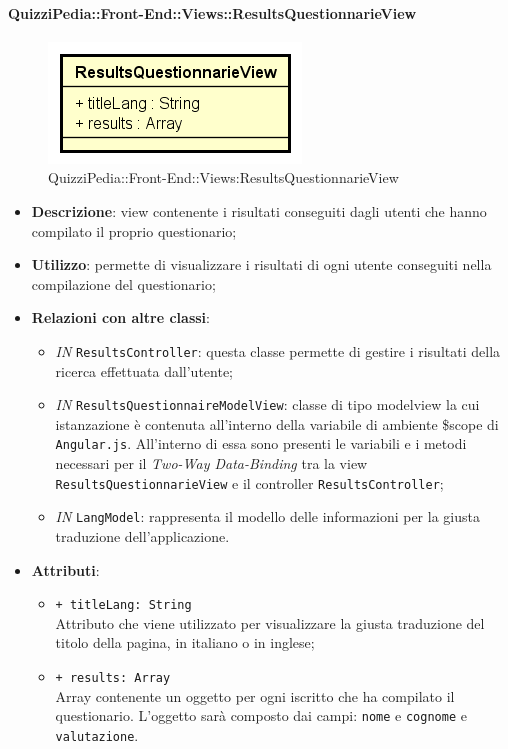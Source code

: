 \paragraph{QuizziPedia::Front-End::Views::ResultsQuestionnarieView}
\begin{figure} [ht]
	\centering
	\includegraphics[scale=0.80]{UML/Classi/Front-End/QuizziPedia_Front-end_ResultsQuestionnarieView.png}
	\caption{QuizziPedia::Front-End::Views:ResultsQuestionnarieView}
\end{figure} \FloatBarrier
\begin{itemize}
	\item \textbf{Descrizione}: view contenente i risultati conseguiti dagli utenti che hanno compilato il proprio questionario;
	\item \textbf{Utilizzo}: permette di visualizzare i risultati di ogni utente conseguiti nella compilazione del questionario;
	\item \textbf{Relazioni con altre classi}:
	\begin{itemize}
		\item \textit{IN} \texttt{ResultsController}: questa classe permette di gestire i risultati della ricerca effettuata dall'utente;
		\item \textit{IN} \texttt{ResultsQuestionnaireModelView}: classe di tipo modelview la cui istanzazione è contenuta all'interno della variabile di ambiente \$scope di \texttt{Angular.js}. All'interno di essa sono presenti le variabili e i metodi necessari per il \textit{Two-Way Data-Binding} tra la view \texttt{ResultsQuestionnarieView} e il controller \texttt{ResultsController}; 
		\item \textit{IN} \texttt{LangModel}: rappresenta il modello delle informazioni per la giusta traduzione dell'applicazione.
	\end{itemize}
	\item \textbf{Attributi}:
	\begin{itemize}
		\item \texttt{+ titleLang: String} \\ Attributo che viene utilizzato per visualizzare la giusta traduzione del titolo della pagina, in italiano o in inglese; 
		\item \texttt{+ results: Array} \\ Array contenente un oggetto per ogni iscritto che ha compilato il questionario. L'oggetto sarà composto dai campi: \texttt{nome} e \texttt{cognome} e \texttt{valutazione}.
	\end{itemize}
\end{itemize}